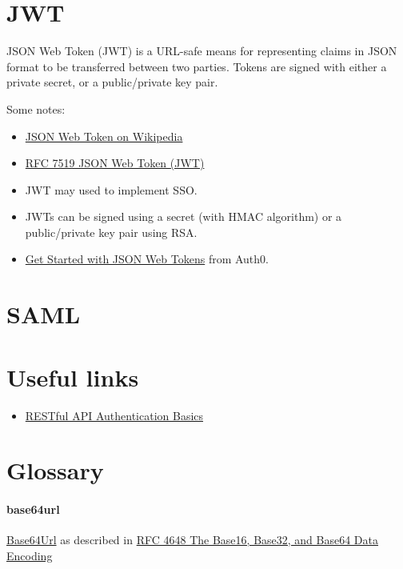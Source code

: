 \documentclass{article}
\begin{document}
\section{JWT}

JSON Web Token (JWT) is a URL-safe means for representing
claims in JSON format to be transferred between two parties.
Tokens are signed with either a private secret, or a public/private
key pair.

Some notes:

\begin{itemize}
  \item \href{https://en.wikipedia.org/wiki/JSON_Web_Token}{%
     JSON Web Token on Wikipedia}
  \item \href{https://tools.ietf.org/html/rfc7519}{%
     RFC 7519 JSON Web Token (JWT)}
 \item JWT may used to implement SSO.
 \item JWTs can be signed using a secret (with HMAC algorithm) or a
   public/private key pair using RSA.
 \item \href{https://auth0.com/learn/json-web-tokens/}{%
Get Started with JSON Web Tokens} from Auth0.
\end{itemize}


\section{SAML}

\section{Useful links}

\begin{itemize}
  \item \href{https://blog.restcase.com/restful-api-authentication-basics/}{%
      RESTful API Authentication Basics}
\end{itemize}


\appendix

\section{Glossary}

\paragraph{base64url} \href{https://en.wikipedia.org/wiki/Base64#URL_applications}{%
  Base64Url} as described in \href{https://tools.ietf.org/html/rfc4648}{%
    RFC 4648 The Base16, Base32, and Base64 Data Encoding}
\end{document}

